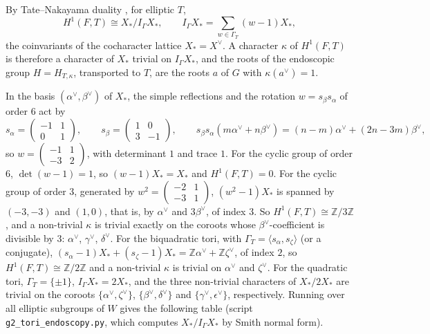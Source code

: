 \documentclass[12pt,letterpaper]{amsart}
\theoremstyle{plain}
\theoremstyle{definition}
\theoremstyle{remark}
\theoremstyle{definition}
\newcommand{\zzz}{\mathbb{Z}}
\begin{document}
By Tate--Nakayama duality \cite[p.~702]{La79}, for elliptic $T$,
\[
H^1(F,T)\cong X_*/I_{\Gamma}X_*,\qquad
I_\Gamma X_*=\sum_{w\in\Gamma_T}(w-1)X_*,
\]
the coinvariants of the cocharacter lattice $X_*=X^\vee$. A character
$\kappa$ of $H^1(F,T)$ is therefore a character of $X_*$ trivial on
$I_\Gamma X_*$, and the roots of the endoscopic group $H=H_{T,\kappa}$,
transported to $T$, are the roots $a$ of $G$ with $\kappa(a^\vee)=1$.

In the basis $(\alpha^\vee,\beta^\vee)$ of $X_*$, the simple reflections and
the rotation $w=s_\beta s_\alpha$ of order $6$ act by
\[
s_\alpha=\begin{pmatrix}-1&1\\0&1\end{pmatrix},\qquad
s_\beta=\begin{pmatrix}1&0\\3&-1\end{pmatrix},\qquad
s_\beta s_\alpha(m\alpha^{\vee}+n\beta^{\vee})=
(n-m)\alpha^{\vee}+(2n-3m)\beta^{\vee},
\]
so $w=\left(\begin{smallmatrix}-1&1\\-3&2\end{smallmatrix}\right)$, with
determinant $1$ and trace $1$.
For the cyclic group of order $6$, $\det(w-1)=1$, so $(w-1)X_*=X_*$ and
$H^1(F,T)=0$. For the cyclic group of order $3$, generated by
$w^2=\left(\begin{smallmatrix}-2&1\\-3&1\end{smallmatrix}\right)$,
$(w^2-1)X_*$ is spanned by $(-3,-3)$ and $(1,0)$, that is, by $\alpha^\vee$
and $3\beta^\vee$, of index $3$. So $H^1(F,T)\cong\zzz/3\zzz$, and a
non-trivial $\kappa$ is trivial exactly on the coroots whose
$\beta^\vee$-coefficient is divisible by $3$: $\alpha^\vee$, $\gamma^\vee$,
$\delta^\vee$. For the biquadratic tori, with $\Gamma_T=\langle s_\alpha,
s_\zeta\rangle$ (or a conjugate), $(s_\alpha-1)X_*+(s_\zeta-1)X_*
=\zzz\alpha^\vee+\zzz\zeta^\vee$, of index $2$, so $H^1(F,T)\cong\zzz/2\zzz$
and a non-trivial $\kappa$ is trivial on $\alpha^\vee$ and $\zeta^\vee$. For
the quadratic tori, $\Gamma_T=\{\pm1\}$, $I_\Gamma X_*=2X_*$, and the three
non-trivial characters of $X_*/2X_*$ are trivial on the coroots
$\{\alpha^\vee,\zeta^\vee\}$, $\{\beta^\vee,\delta^\vee\}$ and
$\{\gamma^\vee,\epsilon^\vee\}$, respectively. Running over all elliptic
subgroups of $W$ gives the following table (script
\texttt{g2\_tori\_endoscopy.py}, which computes $X_*/I_\Gamma X_*$ by Smith
normal form).
\end{document}
